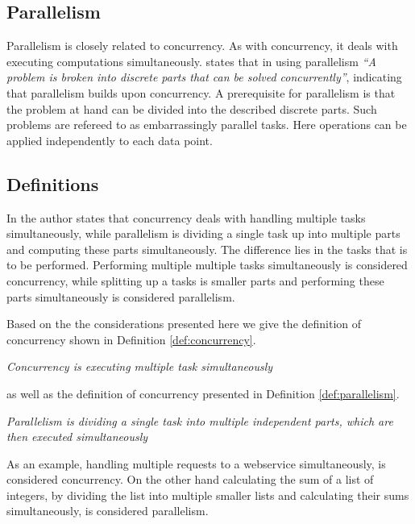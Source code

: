 \subsection{Parallelism}\label{sec:basics_parallelism}
Parallelism is closely related to concurrency. As with concurrency, it deals with executing computations simultaneously. \cite{introPar} states that in using parallelism \textit{``A problem is broken into discrete parts that can be solved concurrently''}, indicating that parallelism builds upon concurrency. A prerequisite for parallelism is that the problem at hand can be divided into the described discrete parts. Such problems are refereed to as embarrassingly parallel tasks\cite{sutter2005software}. Here operations can be applied independently to each data point.

\subsection{Definitions}\label{sec:basics_concurrency_parallelism_def}
In \cite[p. 24]{sevenModels} the author states that concurrency deals with handling multiple tasks simultaneously, while parallelism is dividing a single task up into multiple parts and computing these parts simultaneously. The difference lies in the tasks that is to be performed. Performing multiple multiple tasks simultaneously is considered concurrency, while splitting up a tasks is smaller parts and performing these parts simultaneously is considered   parallelism.

Based on the the considerations presented here we give the definition of concurrency shown in Definition \ref{def:concurrency}.

\begin{defn}\label{def:concurrency}
\emph{Concurrency is executing multiple task simultaneously}
\end{defn}
as well as the definition of concurrency presented in Definition \ref{def:parallelism}.

\begin{defn}\label{def:parallelism}
\emph{Parallelism is dividing a single task into multiple independent parts, which are then executed simultaneously}
\end{defn}
As an example, handling multiple requests to a webservice simultaneously, is considered concurrency. On the other hand calculating the sum of a list of integers, by dividing the list into multiple smaller lists and calculating their sums simultaneously, is considered parallelism.

